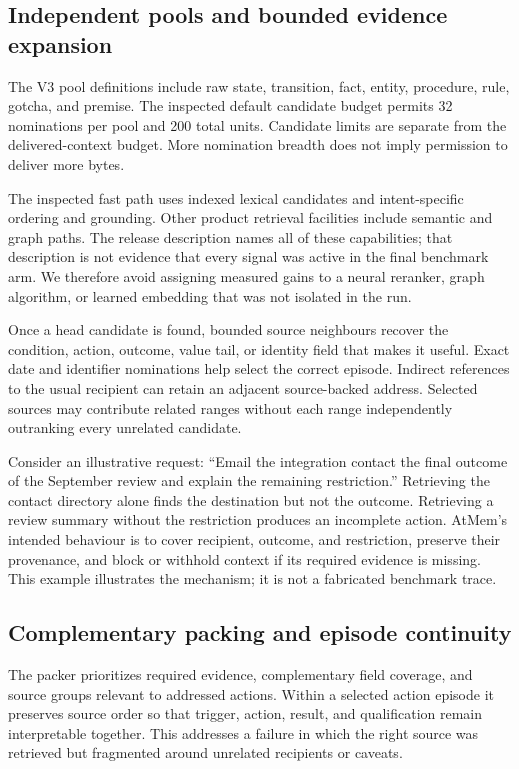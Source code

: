 \documentclass[10pt,twocolumn]{article}
\begin{document}
\subsection{Independent pools and bounded evidence expansion}
The V3 pool definitions include raw state, transition, fact, entity, procedure, rule, gotcha, and premise. The inspected default candidate budget permits 32 nominations per pool and 200 total units. Candidate limits are separate from the delivered-context budget. More nomination breadth does not imply permission to deliver more bytes.

The inspected fast path uses indexed lexical candidates and intent-specific ordering and grounding. Other product retrieval facilities include semantic and graph paths. The release description names all of these capabilities; that description is not evidence that every signal was active in the final benchmark arm. We therefore avoid assigning measured gains to a neural reranker, graph algorithm, or learned embedding that was not isolated in the run.

Once a head candidate is found, bounded source neighbours recover the condition, action, outcome, value tail, or identity field that makes it useful. Exact date and identifier nominations help select the correct episode. Indirect references to the usual recipient can retain an adjacent source-backed address. Selected sources may contribute related ranges without each range independently outranking every unrelated candidate.

Consider an illustrative request: ``Email the integration contact the final outcome of the September review and explain the remaining restriction.'' Retrieving the contact directory alone finds the destination but not the outcome. Retrieving a review summary without the restriction produces an incomplete action. AtMem's intended behaviour is to cover recipient, outcome, and restriction, preserve their provenance, and block or withhold context if its required evidence is missing. This example illustrates the mechanism; it is not a fabricated benchmark trace.

\subsection{Complementary packing and episode continuity}
The packer prioritizes required evidence, complementary field coverage, and source groups relevant to addressed actions. Within a selected action episode it preserves source order so that trigger, action, result, and qualification remain interpretable together. This addresses a failure in which the right source was retrieved but fragmented around unrelated recipients or caveats.
\end{document}

